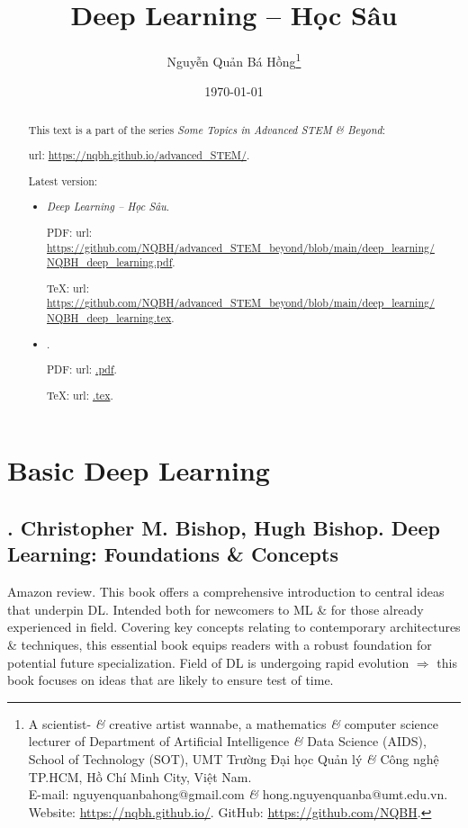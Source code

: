 \documentclass{article}
\title{Deep Learning -- Học Sâu}
\author{Nguyễn Quản Bá Hồng\footnote{A scientist- {\it\&} creative artist wannabe, a mathematics {\it\&} computer science lecturer of Department of Artificial Intelligence {\it\&} Data Science (AIDS), School of Technology (SOT), UMT Trường Đại học Quản lý {\it\&} Công nghệ TP.HCM, Hồ Chí Minh City, Việt Nam.\\E-mail: {\sf nguyenquanbahong@gmail.com} {\it\&} {\sf hong.nguyenquanba@umt.edu.vn}. Website: \url{https://nqbh.github.io/}. GitHub: \url{https://github.com/NQBH}.}}
\date{\today}
\begin{document}
\maketitle
\begin{abstract}
	This text is a part of the series {\it Some Topics in Advanced STEM \& Beyond}:

	{\sc url}: \url{https://nqbh.github.io/advanced_STEM/}.

	Latest version:
	\begin{itemize}
		\item {\it Deep Learning -- Học Sâu}.

		PDF: {\sc url}: \url{https://github.com/NQBH/advanced_STEM_beyond/blob/main/deep_learning/NQBH_deep_learning.pdf}.

		\TeX: {\sc url}: \url{https://github.com/NQBH/advanced_STEM_beyond/blob/main/deep_learning/NQBH_deep_learning.tex}.
		\item {\it }.

		PDF: {\sc url}: \url{.pdf}.

		\TeX: {\sc url}: \url{.tex}.
	\end{itemize}
\end{abstract}
\tableofcontents


\section{Basic Deep Learning}


\subsection{\cite{Bishop_Bishop2024}. {\sc Christopher M. Bishop, Hugh Bishop}. Deep Learning: Foundations \& Concepts}
{}

{\sf Amazon review.} This book offers a comprehensive introduction to central ideas that underpin DL. Intended both for newcomers to ML \& for those already experienced in field. Covering key concepts relating to contemporary architectures \& techniques, this essential book equips readers with a robust foundation for potential future specialization. Field of DL is undergoing rapid evolution $\Rightarrow$ this book focuses on ideas that are likely to ensure test of time.
\end{document}
